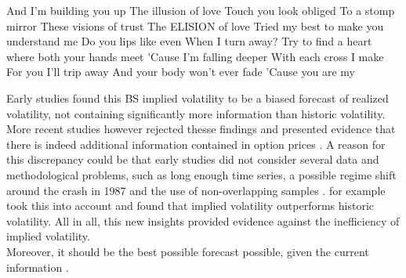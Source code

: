 


And I'm building you up
The illusion of love
Touch you look obliged
To a stomp mirror
These visions of trust
The ELISION of love
Tried my best to make you understand me
Do you lips like even
When I turn away?
Try to find a heart where both your hands meet
'Cause I'm falling deeper
With each cross I make
For you I'll trip away
And your body won't ever fade
'Cause you are my

%



%


Early studies found this \ac{BS} implied volatility to be a biased forecast of realized volatility, not containing significantly more information than historic volatility. More recent studies however rejected thesse findings and presented evidence that there is indeed additional information contained in option prices \parencite{jiang2003}. A reason for this discrepancy could be that early studies did not consider several data and methodological problems, such as long enough time series, a possible regime shift around the crash in 1987 and the use of non-overlapping samples \parencite{jiang2003}. \citeauthor{christensen1998} for example took this into account and found that implied volatility outperforms historic volatility. All in all, this new insights provided evidence against the inefficiency of implied volatility.\\

Moreover, it should be the best possible forecast possible, given the current information \parencite{christensen2002}.

